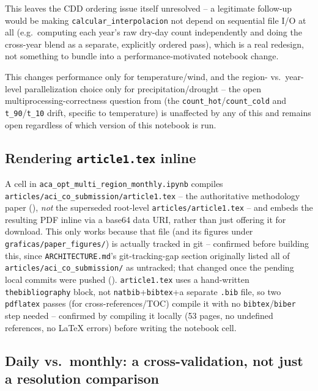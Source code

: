 \documentclass[11pt]{article}
\begin{document}
This leaves the CDD ordering issue itself unresolved -- a legitimate
follow-up would be making \texttt{calcular\_interpolacion} not depend on
sequential file I/O at all (e.g.\ computing each year's raw dry-day count
independently and doing the cross-year blend as a separate, explicitly
ordered pass), which is a real redesign, not something to bundle into a
performance-motivated notebook change.

This changes performance only for temperature/wind, and the region- vs.\
year-level parallelization choice only for precipitation/drought -- the
open multiprocessing-correctness question from 
(the \texttt{count\_hot}/\texttt{count\_cold} and \texttt{t\_90}/\texttt{t\_10}
drift, specific to temperature) is unaffected by any of this and remains
open regardless of which version of this notebook is run.

\subsection{Rendering \texttt{article1.tex} inline}

A cell in \texttt{aca\_opt\_multi\_region\_monthly.ipynb} compiles
\texttt{articles/aci\_co\_submission/article1.tex} -- the authoritative
methodology paper (\Cref{sec:aci-co-target}), \emph{not} the superseded
root-level \texttt{articles/article1.tex} -- and embeds the resulting PDF
inline via a base64 data URI, rather than just offering it for download.
This only works because that file (and its figures under
\texttt{graficas/paper\_figures/}) is actually tracked in git -- confirmed
before building this, since \texttt{ARCHITECTURE.md}'s git-tracking-gap
section originally listed all of \texttt{articles/aci\_co\_submission/} as
untracked; that changed once the pending local commits were pushed
(\Cref{sec:git-gap}). \texttt{article1.tex} uses a hand-written
\texttt{thebibliography} block, not \texttt{natbib}+\texttt{bibtex}+a
separate \texttt{.bib} file, so two \texttt{pdflatex} passes (for
cross-references/TOC) compile it with no \texttt{bibtex}/\texttt{biber}
step needed -- confirmed by compiling it locally (53 pages, no undefined
references, no LaTeX errors) before writing the notebook cell.

\subsection{Daily vs.\ monthly: a cross-validation, not just a resolution
comparison}
\label{sec:daily-vs-monthly}
\end{document}

